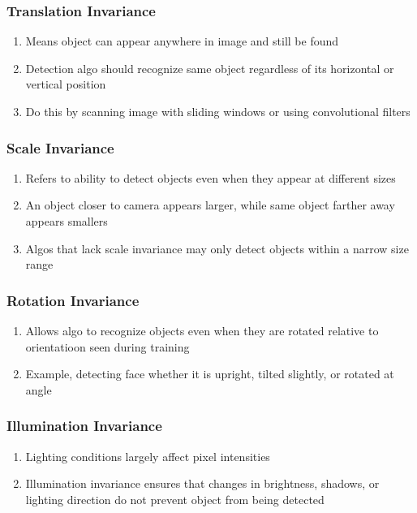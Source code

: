 \documentclass[12pt]{article}
\begin{document}
\subsubsection{Translation Invariance}
\begin{enumerate}
    \item Means object can appear anywhere in image and still be found
    \item Detection algo should recognize same object regardless of its horizontal or vertical position
    \item Do this by scanning image with sliding windows or using convolutional filters
\end{enumerate}

\subsubsection{Scale Invariance}
\begin{enumerate}
    \item Refers to ability to detect objects even when they appear at different sizes
    \item An object closer to camera appears larger, while same object farther away appears smallers
    \item Algos that lack scale invariance may only detect objects within a narrow size range
\end{enumerate}

\subsubsection{Rotation Invariance}
\begin{enumerate}
    \item Allows algo to recognize objects even when they are rotated relative to orientatioon seen during training
    \item Example, detecting face whether it is upright, tilted slightly, or rotated at angle
\end{enumerate}

\subsubsection{Illumination Invariance}
\begin{enumerate}
    \item Lighting conditions largely affect pixel intensities
    \item Illumination invariance ensures that changes in brightness, shadows, or lighting direction do not prevent object from being detected
\end{enumerate}
\end{document}
